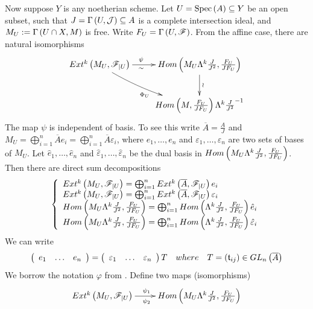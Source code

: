 \documentclass[12pt]{article}
\begin{document}
Now suppose $Y$ is any noetherian scheme. Let $U=\spec{A}\subseteq Y$ be an open subset, such that 
$J=\Gamma\LRf{U, {\CJ}}\subseteq A$ is a complete intersection ideal, and $M_U:=\Gamma\LRf{U\cap X, M}$ is free.
Write $F_U=\Gamma\LRf{U, {\SF}}$. From the affine case, there are natural isomorphisms
\begin{equation}\label{proffendia}
\diagram
{E}xt^k\LRf{M_U, {\SF}_{|U}} \ar[r]^{\psi\qquad}_{\sim\qquad} \ar@/_/[dr]_{\Phi_U}& {H}om\LRf{M_U\Lambda^k\frac{{J}}{{J}^2}, \frac{F_U}{{J}{F}_U}}\ar[d]^{\wr}\\
& {H}om\LRf{M, \frac{F_U}{{J}{F_U}}}\Lambda^k\frac{{J}}{{J}^2}^{-1}\\
\enddiagram
\end{equation}
The map $\psi$ is independent of basis. To see this write $\overline{A}= \frac{A}{J}$ and $M_U=\bigoplus_{i=1}^n\overline{A}e_i= \bigoplus_{i=1}^n\overline{A}\varepsilon_i$, where $e_1, \ldots, e_n$ and $\varepsilon_1, \ldots, 
\varepsilon_n$ are   two sets of  bases of $M_U$. 
Let $\hat{e}_1, \ldots, \hat{e}_n$ and $\hat{\varepsilon}_1, \ldots, 
\hat{\varepsilon}_n$ be the dual basis in
 $Hom\LRf{M_U\Lambda^k\frac{J}{J^2}, \frac{F_U}{JF_U}}$.
Then there are direct sum decompositions 
$$
\LBrace{{l}
{E}xt^k\LRf{M_U, {\SF}_{|U}}=\bigoplus_{i=1}^n{E}xt^k\LRf{\overline{A}, {\SF}_{|U}}e_i\\
{E}xt^k\LRf{M_U, {\SF}_{|U}}=\bigoplus_{i=1}^n{E}xt^k\LRf{\overline{A}, {\SF}_{|U}}\varepsilon_i\\
{H}om\LRf{M_U\Lambda^k\frac{{J}}{{J}^2}, \frac{F_U}{{J}{F}_U}}=\bigoplus_{i=1}^n {H}om\LRf{\Lambda^k\frac{{J}}{{J}^2}, \frac{F_U}{{J}{F}_U}}\hat{e}_i\\
{H}om\LRf{M_U\Lambda^k\frac{{J}}{{J}^2}, \frac{F_U}{{J}{F}_U}}=\bigoplus_{i=1}^n {H}om\LRf{\Lambda^k\frac{{J}}{{J}^2}, \frac{F_U}{{J}{F}_U}}\hat{\varepsilon}_i\\
}
$$
%
We can write 
$$
\matrix{{ccc} e_1 & \ldots & e_n}= \matrix{{ccc} \varepsilon_1 & \ldots & \varepsilon_n}T
\quad where\quad T=\LRf{\t_{ij}}\in GL_n\LRf{\overline{A}}
$$ 
We borrow the notation $\varphi$ from \cite[Thm I.4.5]{AK70}. 
Define two maps (isomorphisms)
$$
\diagram
{E}xt^k\LRf{M_U, {\SF}_{|U}} \ar[r]^{\psi_1\quad}_{ \psi_2\quad}& 
{H}om\LRf{M_U\Lambda^k\frac{{J}}{{J}^2}, \frac{F_U}{{J}{F}_U}}\\
\enddiagram
$$
\end{document}
